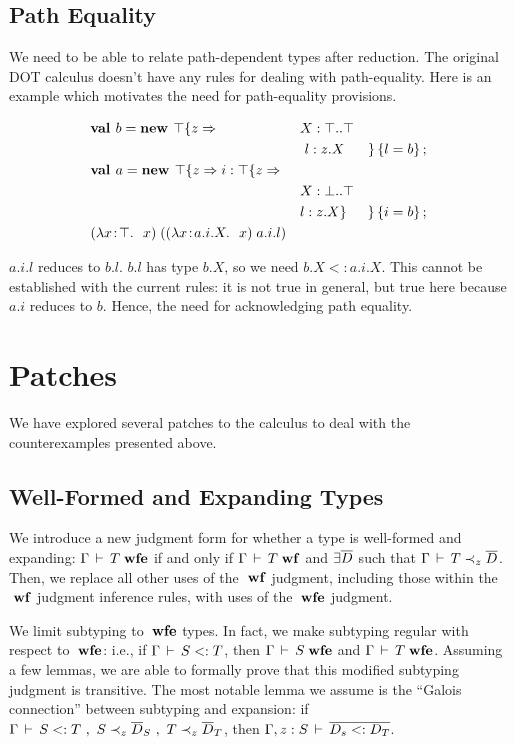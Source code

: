 \documentclass[preprint]{sigplanconf}
\begin{document}
\subsection{Path Equality}\label{patheq}

We need to be able to relate path-dependent types after reduction. The
original DOT calculus doesn't have any rules for dealing with
path-equality. Here is an example which motivates the need for
path-equality provisions.

\begin{align*}
&\textbf{val }b = \textbf{new }\top \{z \Rightarrow &&X : \top..\top&\\
&&&\ l : z.X& \}\left\{l = b\right\} ;\;\\&
\textbf{val }a = \textbf{new }\top \{z \Rightarrow i : \top \{z \Rightarrow &&&\\
&&&X : \bot..\top\\
&&&l : z.X \}& \}\left\{i = b\right\} ;\;\\&
(\lambda x\!:\!\top.\ \ x)\;((\lambda x\!:\!a.i.X.\ \ x)\;a.i.l)
\end{align*}

$a.i.l$ reduces to $b.l$. $b.l$ has type $b.X$, so we need $b.X <:
a.i.X$. This cannot be established with the current rules: it is not
true in general, but true here because $a.i$ reduces to $b$. Hence,
the need for acknowledging path equality.

\section{Patches}\label{patches}

We have explored several patches to the calculus to deal with the
counterexamples presented above.

\subsection{Well-Formed and Expanding Types}\label{wfe}

We introduce a new judgment form for whether a type is well-formed
and expanding: $\Gamma \,\vdash\, T \;\mbox{\textbf{wfe}}$ if and only if $\Gamma \,\vdash\, T \;\mbox{\textbf{wf}}$
and $\exists \overline{D}$ such that $\Gamma \,\vdash\, T \prec_z \overline{D}$. Then,
we replace all other uses of the $\;\mbox{\textbf{wf}}$ judgment, including those
within the $\;\mbox{\textbf{wf}}$ judgment inference rules, with uses of the $\;\mbox{\textbf{wfe}}$
judgment.

We limit subtyping to $\;\mbox{\textbf{wfe}}$ types. In fact, we make subtyping regular
with respect to $\;\mbox{\textbf{wfe}}$: i.e., if $\Gamma \,\vdash\, S <: T$, then $\Gamma \,\vdash\,
S \;\mbox{\textbf{wfe}}$ and $\Gamma \,\vdash\, T \;\mbox{\textbf{wfe}}$. Assuming a few lemmas, we are able to
formally prove that this modified subtyping judgment is
transitive. The most notable lemma we assume is the ``Galois
connection'' between subtyping and expansion: if $\Gamma \,\vdash\, S <: T
~,~ S \prec_z \overline{D}_S ~,~ T \prec_z\overline{D}_T$, then
$\Gamma , z: S \,\vdash\, \overline{D_s <: D_T}$.
\end{document}
